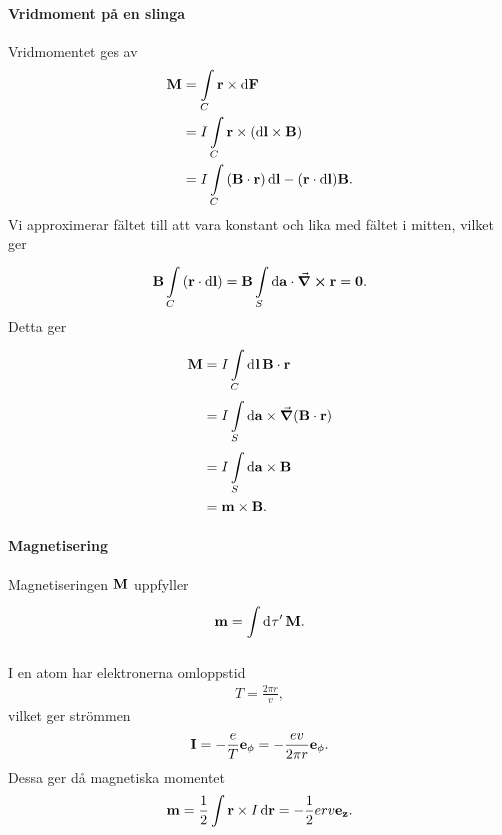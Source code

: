 \paragraph{Vridmoment på en slinga}
Vridmomentet ges av
\begin{align*}
	\vb{M} &= \int\limits_{C}{\vb{r}\times\dd{\vb{F}}} \\
	       &= I\int\limits_{C}{\vb{r}\times(\dd{\vb{l}}\times\vb{B})} \\
	       &= I\int\limits_{C}{(\vb{B}\cdot\vb{r})\dd{\vb{l}} - (\vb{r}\cdot\dd{\vb{l}})\vb{B}}.
\end{align*}
Vi approximerar fältet till att vara konstant och lika med fältet i mitten, vilket ger
\begin{align*}
	\vb{B}\int\limits_{C}{(\vb{r}\cdot\dd{\vb{l}})} = \vb{B}\int\limits_{S}^{}\dd{\vb{\vb{a}}}\cdot \curl{\vb{r}} = \vb{0}.
\end{align*}
Detta ger
\begin{align*}
	\vb{M} &= I\int\limits_{C}^{}\dd[]{\vb{l}}\vb{B}\cdot\vb{r} \\
	       &= I\int\limits_{S}^{}\dd{\vb{a}}\times \grad(\vb{B}\cdot\vb{r}) \\
	       &= I\int\limits_{S}^{}\dd{\vb{a}}\times \vb{B} \\
	       &= \vb{m}\times\vb{B}.
\end{align*}

\paragraph{Magnetisering}
Magnetiseringen $\vb{M}$ uppfyller
\begin{align*}
	\vb{m} = \int\limits_{}^{}\dd[]{\tau'}\vb{M}.
\end{align*}

I en atom har elektronerna omloppstid
\begin{align*}
	T = \frac{2\pi r}{v},
\end{align*}
vilket ger strömmen
\begin{align*}
	\vb{I} = -\frac{e}{T}\vb{e}_{\vb{\phi}} = -\frac{ev}{2\pi r}\vb{e}_{\vb{\phi}}.
\end{align*}
Dessa ger då magnetiska momentet
\begin{align*}
	\vb{m} = \frac{1}{2}\int{\vb{r}\times I\dd{\vb{r}}} = -\frac{1}{2}erv\vb{e}_{\vb{z}}.
\end{align*}

